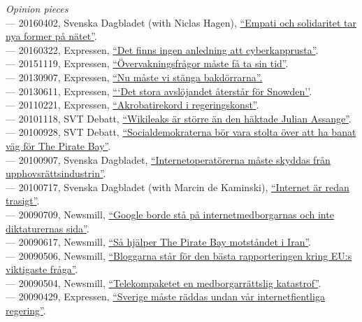 \documentclass[a4paper,11pt,oneside]{article}
\begin{document}
{  \noindent \emph{Opinion pieces} \\
  --- 20160402, Svenska Dagbladet (with Niclas Hagen), \href{http://www.svd.se/empati-och-solidaritet-tar-nya-former-pa-natet}{``Empati och solidaritet tar nya former på nätet''}. \\
  --- 20160322, Expressen, \href{http://www.expressen.se/debatt/finns-ingen-anledning-att-cyberkapprusta/}{``Det finns ingen anledning att cyberkapprusta''}. \\
  --- 20151119, Expressen, \href{http://www.expressen.se/debatt/overvakningsfragor-maste-fa-ta-sin-tid/}{``Övervakningsfrågor måste få ta sin tid''}. \\
  --- 20130907, Expressen, \href{http://www.expressen.se/debatt/nu-maste-vi-stanga-bakdorrarna/}{``Nu måste vi stänga bakdörrarna''.} \\
  --- 20130611, Expressen, \href{http://www.expressen.se/debatt/det-stora-avslojandet-aterstar-for-snowden/}{```Det stora avslöjandet återstår för Snowden''}. \\
  --- 20110221, Expressen, \href{http://www.expressen.se/debatt/christopher-kullenberg-akrobatikrekord-i-regeringskonst/}{``Akrobatirekord i regeringskonst''}. \\
  --- 20101118, SVT Debatt, \href{}{``Wikileaks är större än den häktade Julian Assange''}. \\
  --- 20100928, SVT Debatt, \href{}{``Socialdemokraterna bör vara stolta över att ha banat väg för The Pirate Bay''}. \\
  --- 20100907, Svenska Dagbladet, \href{http://www.svd.se/internetoperatorerna-maste-skyddas-fran-upphovsrattsindustrin}{``Internetoperatörerna måste skyddas från upphovsrättsindustrin''}. \\
  --- 20100717, Svenska Dagbladet (with Marcin de Kaminski), \href{http://www.svd.se/internet-ar-redan-trasigt}{``Internet är redan trasigt''}. \\
  --- 20090709, Newsmill, \href{}{``Google borde stå på internetmedborgarnas och inte diktaturernas sida''}. \\
  --- 20090617, Newsmill, \href{}{``Så hjälper The Pirate Bay motståndet i Iran''}. \\
  --- 20090506, Newsmill, \href{}{``Bloggarna står för den bästa rapporteringen kring EU:s viktigaste fråga''}. \\
  --- 20090504, Newsmill, \href{}{``Telekompaketet en medborgarrättslig katastrof''}. \\
  --- 20090429, Expressen, \href{http://www.expressen.se/debatt/sverige-maste-raddas-undan-var-internetfientliga-regering/}{``Sverige måste räddas undan vår internetfientliga regering''}. \\
}
\end{document}
